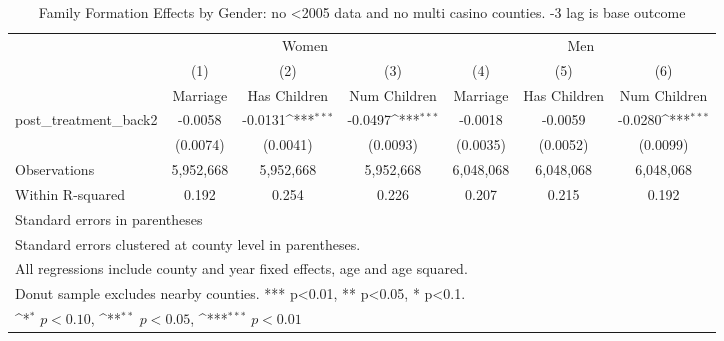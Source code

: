 \begin{table}[htbp]\centering
\def\sym#1{\ifmmode^{#1}\else\(^{#1}\)\fi}
\caption{Family Formation Effects by Gender: no <2005 data and no multi casino counties. -3 lag is base outcome}
\begin{tabular}{l*{6}{c}}
\hline\hline
            &\multicolumn{3}{c}{Women}                                        &\multicolumn{3}{c}{Men}                                          \\\cmidrule(lr){2-4}\cmidrule(lr){5-7}
            &\multicolumn{1}{c}{(1)}&\multicolumn{1}{c}{(2)}&\multicolumn{1}{c}{(3)}&\multicolumn{1}{c}{(4)}&\multicolumn{1}{c}{(5)}&\multicolumn{1}{c}{(6)}\\
            &\multicolumn{1}{c}{Marriage}&\multicolumn{1}{c}{Has Children}&\multicolumn{1}{c}{Num Children}&\multicolumn{1}{c}{Marriage}&\multicolumn{1}{c}{Has Children}&\multicolumn{1}{c}{Num Children}\\
\hline
post\_treatment\_back2&     -0.0058         &     -0.0131\sym{***}&     -0.0497\sym{***}&     -0.0018         &     -0.0059         &     -0.0280\sym{***}\\
            &    (0.0074)         &    (0.0041)         &    (0.0093)         &    (0.0035)         &    (0.0052)         &    (0.0099)         \\
\hline
Observations&   5,952,668         &   5,952,668         &   5,952,668         &   6,048,068         &   6,048,068         &   6,048,068         \\
Within R-squared&       0.192         &       0.254         &       0.226         &       0.207         &       0.215         &       0.192         \\
\hline\hline
\multicolumn{7}{l}{\footnotesize Standard errors in parentheses}\\
\multicolumn{7}{l}{\footnotesize Standard errors clustered at county level in parentheses.}\\
\multicolumn{7}{l}{\footnotesize All regressions include county and year fixed effects, age and age squared.}\\
\multicolumn{7}{l}{\footnotesize Donut sample excludes nearby counties. *** p<0.01, ** p<0.05, * p<0.1.}\\
\multicolumn{7}{l}{\footnotesize \sym{*} \(p<0.10\), \sym{**} \(p<0.05\), \sym{***} \(p<0.01\)}\\
\end{tabular}
\end{table}
